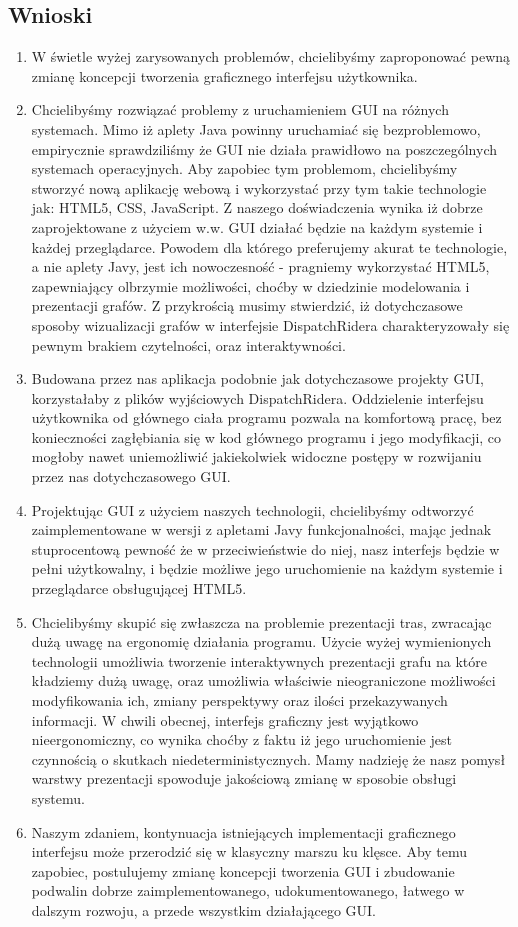 \subsection{Wnioski}
\begin{enumerate}
\item W świetle wyżej zarysowanych problemów, chcielibyśmy zaproponować pewną zmianę koncepcji tworzenia graficznego interfejsu użytkownika.
\item Chcielibyśmy rozwiązać problemy z uruchamieniem GUI na różnych systemach. Mimo iż aplety Java powinny uruchamiać się bezproblemowo, empirycznie sprawdziliśmy że GUI nie działa prawidłowo na poszczególnych systemach operacyjnych. Aby zapobiec tym problemom, chcielibyśmy stworzyć nową aplikację webową i wykorzystać przy tym takie technologie jak: HTML5, CSS, JavaScript. Z naszego doświadczenia wynika iż dobrze zaprojektowane z użyciem w.w. GUI działać będzie na każdym systemie i każdej przeglądarce. Powodem dla którego preferujemy akurat te technologie, a nie aplety Javy, jest ich nowoczesność - pragniemy wykorzystać HTML5, zapewniający olbrzymie możliwości, choćby w dziedzinie modelowania i prezentacji grafów. Z przykrością musimy stwierdzić, iż dotychczasowe sposoby wizualizacji grafów w interfejsie DispatchRidera charakteryzowały się pewnym brakiem czytelności, oraz interaktywności.
\item Budowana przez nas aplikacja podobnie jak dotychczasowe projekty GUI, korzystałaby z plików wyjściowych DispatchRidera. Oddzielenie interfejsu użytkownika od głównego ciała programu pozwala na komfortową pracę, bez konieczności zagłębiania się w kod głównego programu i jego modyfikacji, co mogłoby nawet uniemożliwić jakiekolwiek widoczne postępy w rozwijaniu przez nas dotychczasowego GUI.
\item Projektując GUI z użyciem naszych technologii, chcielibyśmy odtworzyć zaimplementowane w wersji z apletami Javy funkcjonalności, mając jednak stuprocentową pewność że w przeciwieństwie do niej, nasz interfejs będzie w pełni użytkowalny, i będzie możliwe jego uruchomienie na każdym systemie i przeglądarce obsługującej HTML5.
\item Chcielibyśmy skupić się zwłaszcza na problemie prezentacji tras, zwracając dużą uwagę na ergonomię działania programu. Użycie wyżej wymienionych technologii umożliwia tworzenie interaktywnych prezentacji grafu na które kładziemy dużą uwagę, oraz umożliwia właściwie nieograniczone możliwości modyfikowania ich, zmiany perspektywy oraz ilości przekazywanych informacji. W chwili obecnej, interfejs graficzny jest wyjątkowo nieergonomiczny, co wynika choćby z faktu iż jego uruchomienie jest czynnością o skutkach niedeterministycznych. Mamy nadzieję że nasz pomysł warstwy prezentacji spowoduje jakościową zmianę w sposobie obsługi systemu.
\item Naszym zdaniem, kontynuacja istniejących implementacji graficznego interfejsu może przerodzić się w klasyczny marszu ku klęsce. Aby temu zapobiec, postulujemy zmianę koncepcji tworzenia GUI i zbudowanie podwalin dobrze zaimplementowanego, udokumentowanego, łatwego w dalszym rozwoju, a przede wszystkim działającego GUI.
\end{enumerate}
